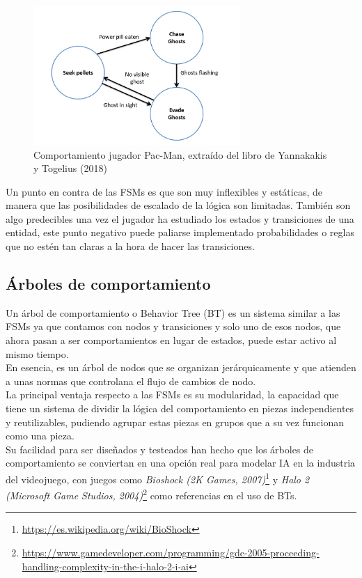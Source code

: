 \begin{figure}[t]
	\centering
	\includegraphics[width = 0.7\textwidth]{Imagenes/FMS_MsPac-man.png}
	\caption{Comportamiento jugador Pac-Man, extraído del libro de Yannakakis y Togelius (2018)}
	\label{fig:Comportamiento jugador Pac-Man}
\end{figure}

Un punto en contra de las FSMs es que son muy inflexibles y estáticas, de manera que las posibilidades de escalado de la lógica son limitadas. También son algo predecibles una vez el jugador ha estudiado los estados y transiciones de una entidad, este punto negativo puede paliarse implementado probabilidades o reglas que no estén tan claras a la hora de hacer las transiciones.

\subsection{Árboles de comportamiento}

Un árbol de comportamiento o Behavior Tree (BT) es un sistema similar a las FSMs ya que contamos con nodos y transiciones y solo uno de esos nodos, que ahora pasan a ser comportamientos en lugar de estados, puede estar activo al mismo tiempo. \\
En esencia, es un árbol de nodos que se organizan jerárquicamente y que atienden a unas normas que controlana el flujo de cambios de nodo. \\

La principal ventaja respecto a las FSMs es su modularidad, la capacidad que tiene un sistema de dividir la lógica del comportamiento en piezas independientes y reutilizables, pudiendo agrupar estas piezas en grupos que a su vez funcionan como una pieza. \\
Su facilidad para ser diseñados y testeados han hecho que los árboles de comportamiento se conviertan en una opción real para modelar IA en la industria del videojuego, con juegos como \textit{Bioshock (2K Games, 2007)}\footnote{\url{https://es.wikipedia.org/wiki/BioShock}} y \textit{Halo 2 (Microsoft Game Studios, 2004)}\footnote{\url{ https://www.gamedeveloper.com/programming/gdc-2005-proceeding-handling-complexity-in-the-i-halo-2-i-ai}} como referencias en el uso de BTs.\\


